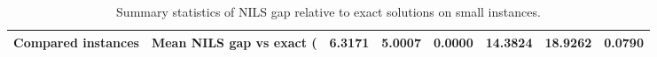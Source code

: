 \begin{table}
\caption{Summary statistics of NILS gap relative to exact solutions on small instances.}
\label{tab:small_exact_vs_nils_summary}
\begin{tabular}{rrrrrrr}
\toprule
Compared instances & Mean NILS gap vs exact (%
 & 6.3171 & 5.0007 & 0.0000 & 14.3824 & 18.9262 & 0.0790 \\
\bottomrule
\end{tabular}
\end{table}
